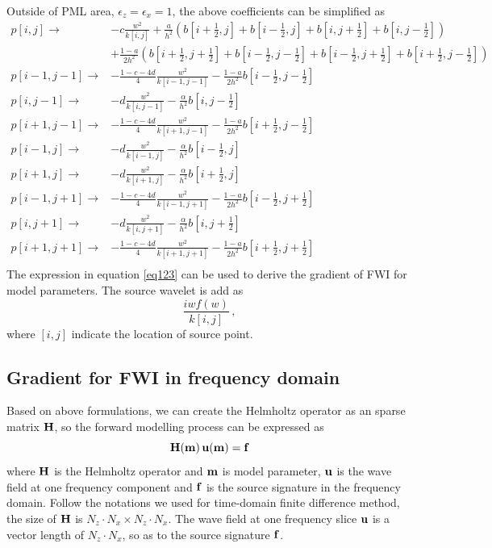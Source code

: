 \documentclass[revised,endfloat]{geophysics}
\begin{document}
Outside of PML area, $\epsilon_z=\epsilon_x=1$, the above coefficients can be simplified as 
\begin{equation}
\begin{split}
p[i,j] \rightarrow & -c\frac{w^2}{k[i,j]} + \frac{a}{h^2}( b[i+\frac{1}{2},j]+ b[i-\frac{1}{2},j]+b[i,j+\frac{1}{2}]+b[i,j-\frac{1}{2}]) \\
  & + \frac{1-a}{2h^2}(b[i+\frac{1}{2},j+\frac{1}{2}]+b[i-\frac{1}{2},j-\frac{1}{2}]+b[i-\frac{1}{2},j+\frac{1}{2}]+b[i+\frac{1}{2},j-\frac{1}{2}]) \\
 p[i-1,j-1] \rightarrow & -\frac{1-c-4d}{4} \frac{w^2}{k[i-1,j-1]} -  \frac{1-a}{2h^2}b[i-\frac{1}{2},j-\frac{1}{2}] \\
 p[i,j-1]   \rightarrow & -d \frac{w^2}{k[i,j-1]} - \frac{\alpha}{h^2} b[i,j-\frac{1}{2}] \\
 p[i+1,j-1] \rightarrow & -\frac{1-c-4d}{4} \frac{w^2}{k[i+1,j-1]} - \frac{1-a}{2h^2}b[i+\frac{1}{2},j-\frac{1}{2}] \\
 p[i-1,j]   \rightarrow & -d\frac{w^2}{k[i-1,j]} - \frac{\alpha}{h^2} b[i-\frac{1}{2},j] \\
 p[i+1,j]   \rightarrow & -d\frac{w^2}{k[i+1,j]}  - \frac{\alpha}{h^2} b[i+\frac{1}{2},j] \\
 p[i-1,j+1] \rightarrow & -\frac{1-c-4d}{4} \frac{w^2}{k[i-1,j+1]} -\frac{1-a}{2h^2}b[i-\frac{1}{2},j+\frac{1}{2}] \\
 p[i,j+1]   \rightarrow & -d\frac{w^2}{k[i,j+1]} - \frac{\alpha}{h^2} b[i,j+\frac{1}{2}] \\
 p[i+1,j+1] \rightarrow & -\frac{1-c-4d}{4} \frac{w^2}{k[i+1,j+1]} - \frac{1-a}{2h^2}b[i+\frac{1}{2},j+\frac{1}{2}] \\
\end{split}
\label{eq123}
\end{equation}
The expression in equation \ref{eq123} can be used to derive the gradient of FWI for model parameters. The source wavelet is add as 
\begin{equation}
\frac{iw f(w)}{k[i,j]}\,,
\label{eq124}
\end{equation}
where $[i,j]$ indicate the location of source point.

\subsection{Gradient for FWI in frequency domain}
Based on above formulations, we can create the Helmholtz operator as an sparse matrix ${\bf H}$, so the forward modelling process can be expressed as
\begin{equation}
{{\bf H}({\bf m}) \, {\bf u}({\bf m}) = {\bf f}}
\label{eq125}
\end{equation}
where ${\bf H}$ is the Helmholtz operator and ${\bf m}$ is model parameter, ${\bf u}$ is the wave field at one frequency component and ${\bf f}$ is the source signature in the frequency domain. Follow the notations we used for time-domain finite difference method, the size of ${\bf H}$ is $N_z\cdot N_x \times N_z\cdot N_x$. The wave field at one frequency slice ${\bf u}$ is a vector length of $N_z \cdot N_x$, so as to the source signature ${\bf f}$.
\end{document}
